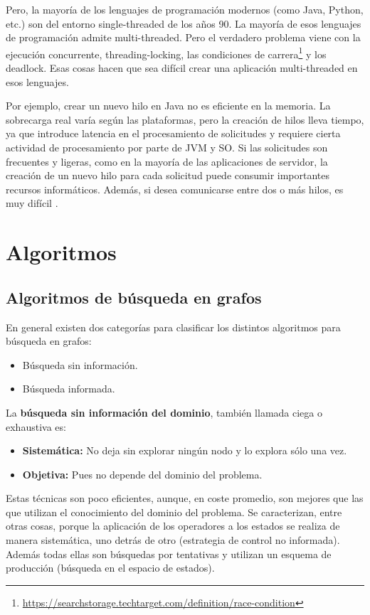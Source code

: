 \documentclass[twoside,twocolumn]{article}
\begin{document}
Pero, la mayoría de los lenguajes de programación modernos (como Java, Python, etc.) son del entorno single-threaded de los años 90. La mayoría de esos lenguajes de programación admite multi-threaded. Pero el verdadero problema viene con la ejecución concurrente, threading-locking, las condiciones de carrera\footnote{\url{https://searchstorage.techtarget.com/definition/race-condition}} y los deadlock. Esas cosas hacen que sea difícil crear una aplicación multi-threaded en esos lenguajes.


Por ejemplo, crear un nuevo hilo en Java no es eficiente en la memoria. La sobrecarga real varía según las plataformas, pero la creación de hilos lleva tiempo, ya que introduce latencia en el procesamiento de solicitudes y requiere cierta actividad de procesamiento por parte de JVM y SO. Si las solicitudes son frecuentes y ligeras, como en la mayoría de las aplicaciones de servidor, la creación de un nuevo hilo para cada solicitud puede consumir importantes recursos informáticos. Además, si desea comunicarse entre dos o más hilos, es muy difícil \cite[pág 73]{Peierls:2006}.



\section{Algoritmos}

\subsection{Algoritmos de búsqueda en grafos}

En general existen dos categorías para clasificar los distintos algoritmos para búsqueda en grafos:
\begin{itemize}
	\item Búsqueda sin información.
	\item Búsqueda informada.
\end{itemize}

La \textbf{búsqueda sin información del dominio}, también llamada ciega o exhaustiva es:
\begin{itemize}
    \item \textbf{Sistemática:} No deja sin explorar ningún nodo y lo explora sólo una vez.
    \item \textbf{Objetiva:} Pues no depende del dominio del problema.
\end{itemize}

\noindent
Estas técnicas son poco eficientes, aunque, en coste promedio, son mejores que las que utilizan el conocimiento del dominio del problema. Se caracterizan, entre otras cosas, porque la aplicación de los operadores a los estados se realiza de manera sistemática, uno detrás de otro (estrategia de control no informada). Además todas ellas son búsquedas por tentativas y utilizan un esquema de producción (búsqueda en el espacio de estados).
\end{document}
